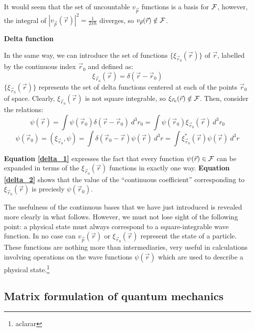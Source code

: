 It would seem that the set of uncountable $v_{\vec{p}}$ functions is a basis for $\mathcal{F}$, however, the integral of $\left|v_{\vec{p}}(\vec{r})\right|^2 = \frac{1}{2\pi\hbar}$ diverges, so $v_{\vec{p}}(\vec{r})\notin \mathcal{F}$.

\textbf{Delta function}

In the same way, we can introduce the set of functions $\{\xi_{\vec{r}_0}(\vec{r})\}$ of $\vec{r}$, labelled by the continuous index $\vec{r}_0$ and defined as:
\begin{equation}
    \xi_{\vec{r}_0}(\vec{r}) = \delta(\vec{r} - \vec{r}_0)
\end{equation}
$\{\xi_{\vec{r}_0}(\vec{r})\}$ represents the set of delta functions centered at each of the points $\vec{r}_0$ of space. Clearly, $\xi_{\vec{r}_0}(\vec{r})$ is not square integrable, so $\xi_{\vec{r}_0}(\vec{r})\notin \mathcal{F}$. Then, consider the relations:
\begin{equation} \label{delta_1}
    \psi(\vec{r}) = \int \psi(\vec{r}_0)\delta(\vec{r} - \vec{r}_0) \ d^3r_0 = \int \psi(\vec{r}_0)\xi_{\vec{r}_0}(\vec{r})\ d^3r_0
\end{equation}
\begin{equation} \label{delta_2}
    \psi(\vec{r}_0) = (\xi_{\vec{r}_0}, \psi) = \int \delta(\vec{r}_0 - \vec{r})\psi(\vec{r}) \ d^3r = \int \xi^*_{\vec{r}_0}(\vec{r})\psi(\vec{r}) \ d^3r
\end{equation}

\textbf{Equation \ref{delta_1}} expresses the fact that every function $\psi(\vec{r})\in\mathcal{F}$ can be expanded in terms of the $\xi_{\vec{r}_0}(\vec{r})$ functions in exactly one way. \textbf{Equation \ref{delta_2}} shows that the value of the ``continuous coefficient'' corresponding to $\xi_{\vec{r}_0}(\vec{r})$ is preciesly $\psi(\vec{r}_0)$. 

The usefulness of the continuous bases that we have just introduced is revealed more clearly in what follows. However, we must not lose sight of the following point: a physical state must always correspond to a square-integrable wave function. In no case can $v_{\vec{p}}(\vec{r})$ or $\xi_{\vec{r}_0}(\vec{r})$ represent the state of a particle. These functions are nothing more than intermediaries, very useful in calculations involving operations on the wave functions $\psi(\vec{r})$ which are used to describe a physical state.\footnote{\color{red}aclarar}



\subsection{Matrix formulation of quantum mechanics}
